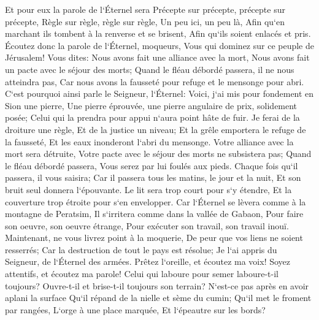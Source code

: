\verse Et pour eux la parole de l`Éternel sera Précepte sur précepte, précepte sur précepte, Règle sur règle, règle sur règle, Un peu ici, un peu là, Afin qu`en marchant ils tombent à la renverse et se brisent, Afin qu`ils soient enlacés et pris. 
\verse Écoutez donc la parole de l`Éternel, moqueurs, Vous qui dominez sur ce peuple de Jérusalem! 
\verse Vous dites: Nous avons fait une alliance avec la mort, Nous avons fait un pacte avec le séjour des morts; Quand le fléau débordé passera, il ne nous atteindra pas, Car nous avons la fausseté pour refuge et le mensonge pour abri. 
\verse C`est pourquoi ainsi parle le Seigneur, l`Éternel: Voici, j`ai mis pour fondement en Sion une pierre, Une pierre éprouvée, une pierre angulaire de prix, solidement posée; Celui qui la prendra pour appui n`aura point hâte de fuir. 
\verse Je ferai de la droiture une règle, Et de la justice un niveau; Et la grêle emportera le refuge de la fausseté, Et les eaux inonderont l`abri du mensonge. 
\verse Votre alliance avec la mort sera détruite, Votre pacte avec le séjour des morts ne subsistera pas; Quand le fléau débordé passera, Vous serez par lui foulés aux pieds. 
\verse Chaque fois qu`il passera, il vous saisira; Car il passera tous les matins, le jour et la nuit, Et son bruit seul donnera l`épouvante. 
\verse Le lit sera trop court pour s`y étendre, Et la couverture trop étroite pour s`en envelopper. 
\verse Car l`Éternel se lèvera comme à la montagne de Peratsim, Il s`irritera comme dans la vallée de Gabaon, Pour faire son oeuvre, son oeuvre étrange, Pour exécuter son travail, son travail inouï. 
\verse Maintenant, ne vous livrez point à la moquerie, De peur que vos liens ne soient resserrés; Car la destruction de tout le pays est résolue; Je l`ai appris du Seigneur, de l`Éternel des armées. 
\verse Prêtez l`oreille, et écoutez ma voix! Soyez attentifs, et écoutez ma parole! 
\verse Celui qui laboure pour semer laboure-t-il toujours? Ouvre-t-il et brise-t-il toujours son terrain? 
\verse N`est-ce pas après en avoir aplani la surface Qu`il répand de la nielle et sème du cumin; Qu`il met le froment par rangées, L`orge à une place marquée, Et l`épeautre sur les bords? 
